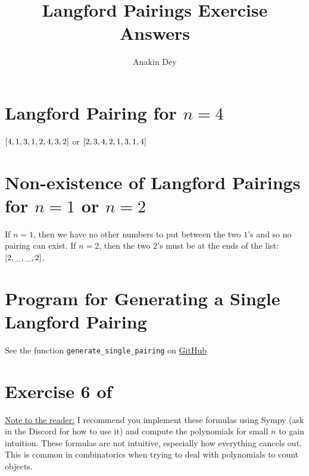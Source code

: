 \documentclass[letterpaper]{article}
\title{Langford Pairings Exercise Answers}
\author{Anakin Dey}
\begin{document}
\maketitle

\section*{Langford Pairing for $n = 4$}

$\bqty{4, 1, 3, 1, 2, 4, 3, 2}$ or $\bqty{2, 3, 4, 2, 1, 3, 1, 4}$

\section*{Non-existence of Langford Pairings for $n = 1$ or $n = 2$}

If $n = 1$, then we have no other numbers to put between the two $1$'s and so no pairing can exist.
If $n = 2$, then the two $2$'s must be at the ends of the list: $\bqty{2, \_, \_, 2}$.

\section*{Program for Generating a Single Langford Pairing}

See the function \texttt{generate\_single\_pairing} on \href{https://github.com/SIGma-UIUC/meetings/blob/main/SP23/3-langford/langford_pairing.py}{GitHub}

\section*{Exercise 6 of \cite[Chapter~7]{TAOCP4A}}

\underline{Note to the reader:} I recommend you implement these formulas using Sympy (ask in the Discord for how to use it) and compute the polynomials for small $n$ to gain intuition.
These formulas are not intuitive, especially how everything cancels out.
This is common in combinatorics when trying to deal with polynomials to count objects.
\end{document}
